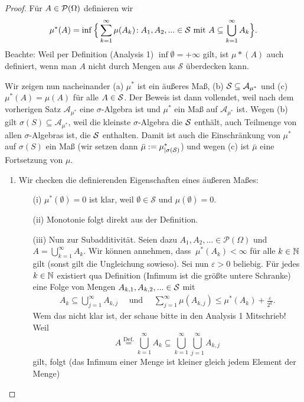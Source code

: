 \begin{proof}
	Für $A \in \mathcal{P}(\Omega)$ definieren wir \[ \mu^{*}(A) = \inf\Big\{ \sum\limits_{k=1}^{\infty} \mu(A_k) \! : A_1,A_2,... \in \mathcal{S} \text{ mit } A \subseteq \bigcup\limits_{k = 1}^{\infty} A_k \Big\}. \]
	Beachte: Weil per Definition (Analysis 1) $\inf \emptyset=+\infty$ gilt, ist $\mu*(A)$ auch definiert, wenn man $A$ nicht durch Mengen aus $\mathcal S$ \"uberdecken kann. \smallskip
	
	Wir zeigen nun nacheinander (a) $\mu^*$ ist ein \"au\ss eres Ma\ss{}, (b) $\mathcal{S} \subseteq \mathcal A_{\mu^*}$ und (c) $\mu^*(A)=\mu(A)$ f\"ur alle $A\in \mathcal{S}$. Der Beweis ist dann vollendet, weil nach dem vorherigen Satz $\mathcal A_{\mu^*}$ eine $\sigma$-Algebra ist und $\mu^*$ ein Ma\ss{} auf $\mathcal A_{\mu^*}$ ist. Wegen (b) gilt $\sigma(S)\subseteq \mathcal A_{\mu^*}$, weil die kleinste $\sigma$-Algebra die $\mathcal{S}$ enth\"alt, auch Teilmenge von allen $\sigma$-Algebras ist, die $\mathcal{S}$ enthalten. Damit ist auch die Einschr\"ankung von $\mu^*$ auf $\sigma(S)$ ein Ma\ss{} (wir setzen dann $\bar{\mu} := \mu^{*}_{|{\sigma(\mathcal{S})}}$) und wegen (c) ist $\bar\mu$ eine Fortsetzung von $\mu$.
\begin{enumerate}[label=(\alph*)]
\item	Wir checken die definierenden Eigenschaften eines \"au\ss eren Ma\ss es:
	\begin{itemize}
		\item[(i)] $\mu^{*}(\emptyset) = 0$ ist klar, weil $\emptyset \in \mathcal S$ und $\mu(\emptyset)=0$.
		\item[(ii)] Monotonie folgt direkt aus der Definition.
		\item[(iii)] Nun zur Subadditivität. Seien dazu $A_1,A_2,... \in \mathcal P(\Omega)$ und $A = \bigcup\limits_{k = 1}^{\infty} A_k.$ Wir k\"onnen annehmen, dass $ \: \mu^{*}(A_k) < \infty$ f\"ur alle $k\in\mathbb{N}$ gilt (sonst gilt die Ungleichung sowieso). Sei nun $\varepsilon > 0$ beliebig. Für jedes $k \in \mathbb{N}$ existiert qua Definition (Infimum ist die gr\"o\ss te untere Schranke) eine Folge von Mengen $A_{k,1},A_{k,2},... \in \mathcal{S}$ mit
		\begin{align*}
			A_k \subseteq \bigcup\limits_{j=1}^{\infty} A_{k,j} \quad \text{ und }\quad \sum\limits_{j=1}^{\infty} \mu(A_{k,j}) \leq \mu^{*}(A_k) + \frac{\varepsilon}{2^k}.			\end{align*}
		Wem das nicht klar ist, der schaue bitte in den Analysis 1 Mitschrieb! Weil \[A \overset{\text{Def.}}{=} \bigcup\limits_{k = 1}^{\infty} A_k \subseteq \bigcup\limits_{k = 1}^{\infty} \bigcup\limits_{j=1}^{\infty} A_{k,j} \] gilt, folgt (das Infimum einer Menge ist kleiner gleich jedem Element der Menge) 

\end{itemize}
\end{enumerate}
\end{proof}
